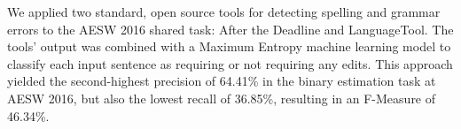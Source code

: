 We applied two standard, open source tools for detecting spelling and grammar errors to the AESW 2016 shared task: After the Deadline and LanguageTool. The tools' output was combined with a Maximum Entropy machine learning model to classify each input sentence as requiring or not requiring any edits. This approach yielded the second-highest precision of 64.41\% in the binary estimation task at AESW 2016, but also the lowest recall of 36.85\%, resulting in an F-Measure of 46.34\%.
